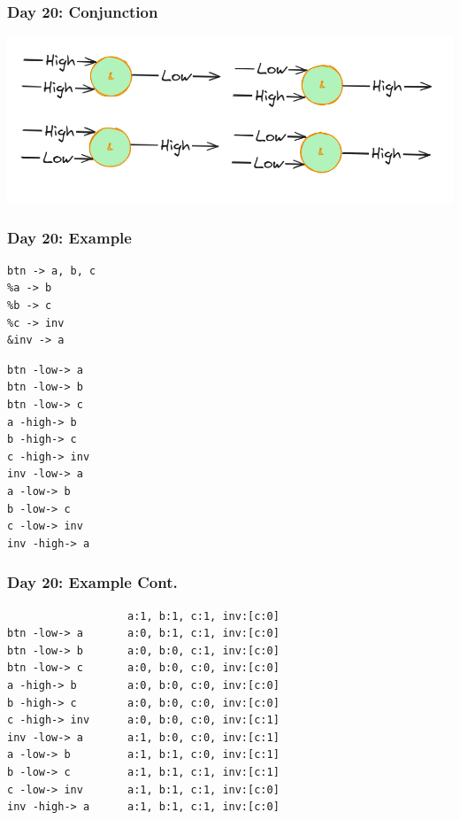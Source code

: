 \begin{frame}
\frametitle{Day 20: Conjunction}

\includegraphics[width=\textwidth]{Day20Conjunction}

\end{frame}

\begin{frame}[fragile]
\frametitle{Day 20: Example}

\begin{center}
\begin{minipage}{0.45\textwidth}
\begin{center}
\begin{verbatim}
btn -> a, b, c
%a -> b
%b -> c
%c -> inv
&inv -> a        
\end{verbatim}
\end{center}
\end{minipage}
\begin{minipage}{0.45\textwidth}
\begin{center}
\begin{verbatim}
btn -low-> a
btn -low-> b
btn -low-> c
a -high-> b
b -high-> c
c -high-> inv
inv -low-> a
a -low-> b
b -low-> c
c -low-> inv
inv -high-> a        
\end{verbatim}
\end{center}
\end{minipage}
\end{center}

\end{frame}

\begin{frame}[fragile]
\frametitle{Day 20: Example Cont.}

\begin{center}
\begin{verbatim}
                   a:1, b:1, c:1, inv:[c:0]
btn -low-> a       a:0, b:1, c:1, inv:[c:0]
btn -low-> b       a:0, b:0, c:1, inv:[c:0]
btn -low-> c       a:0, b:0, c:0, inv:[c:0]
a -high-> b        a:0, b:0, c:0, inv:[c:0]
b -high-> c        a:0, b:0, c:0, inv:[c:0]
c -high-> inv      a:0, b:0, c:0, inv:[c:1]
inv -low-> a       a:1, b:0, c:0, inv:[c:1]
a -low-> b         a:1, b:1, c:0, inv:[c:1]
b -low-> c         a:1, b:1, c:1, inv:[c:1]
c -low-> inv       a:1, b:1, c:1, inv:[c:0]
inv -high-> a      a:1, b:1, c:1, inv:[c:0]
\end{verbatim}
\end{center}

\end{frame}

